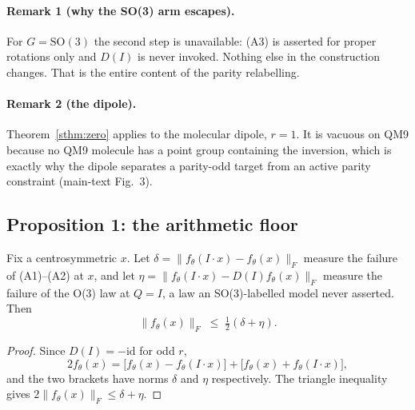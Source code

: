 \paragraph{Remark 1 (why the SO(3) arm escapes).} For $G=\mathrm{SO}(3)$ the second step is unavailable: (A3) is asserted for proper rotations only and $D(I)$ is never invoked. Nothing else in the construction changes. That is the entire content of the parity relabelling.

\paragraph{Remark 2 (the dipole).} Theorem~\ref{sthm:zero} applies to the molecular dipole, $r=1$. It is vacuous on QM9 because no QM9 molecule has a point group containing the inversion, which is exactly why the dipole separates a parity-odd target from an active parity constraint (main-text Fig.~3).

\subsection*{Proposition 1: the arithmetic floor}

\begin{proposition}\label{sprop:floor}
Fix a centrosymmetric $x$. Let $\delta = \lVert f_\theta(I\!\cdot\!x) - f_\theta(x)\rVert_F$ measure the failure of (A1)--(A2) at $x$, and let $\eta = \lVert f_\theta(I\!\cdot\!x) - D(I) f_\theta(x)\rVert_F$ measure the failure of the O(3) law at $Q=I$, a law an SO(3)-labelled model never asserted. Then
\[
\lVert f_\theta(x)\rVert_F \;\le\; \tfrac{1}{2}(\delta + \eta).
\]
\end{proposition}

\begin{proof}
Since $D(I) = -\mathrm{id}$ for odd $r$,
\[
2 f_\theta(x) = \bigl[f_\theta(x) - f_\theta(I\!\cdot\!x)\bigr] + \bigl[f_\theta(x) + f_\theta(I\!\cdot\!x)\bigr],
\]
and the two brackets have norms $\delta$ and $\eta$ respectively. The triangle inequality gives $2\lVert f_\theta(x)\rVert_F \le \delta + \eta$.
\end{proof}

